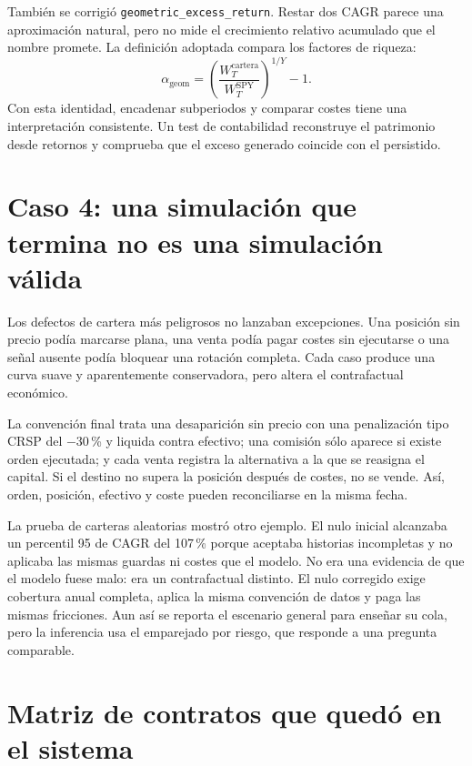 También se corrigió \texttt{geometric\_excess\_return}. Restar dos CAGR parece una aproximación
natural, pero no mide el crecimiento relativo acumulado que el nombre promete. La definición
adoptada compara los factores de riqueza:
\[
 \alpha_{\mathrm{geom}}=
 \left(\frac{W_T^{\mathrm{cartera}}}{W_T^{\mathrm{SPY}}}\right)^{1/Y}-1.
\]
Con esta identidad, encadenar subperiodos y comparar costes tiene una interpretación consistente.
Un test de contabilidad reconstruye el patrimonio desde retornos y comprueba que el exceso generado
coincide con el persistido.

\section{Caso 4: una simulación que termina no es una simulación válida}

Los defectos de cartera más peligrosos no lanzaban excepciones. Una posición sin precio podía
marcarse plana, una venta podía pagar costes sin ejecutarse o una señal ausente podía bloquear una
rotación completa. Cada caso produce una curva suave y aparentemente conservadora, pero altera el
contrafactual económico.

La convención final trata una desaparición sin precio con una penalización tipo CRSP del
$-30$\,\% y liquida contra efectivo; una comisión sólo aparece si existe orden ejecutada; y cada
venta registra la alternativa a la que se reasigna el capital. Si el destino no supera la posición
después de costes, no se vende. Así, orden, posición, efectivo y coste pueden reconciliarse en la
misma fecha.

La prueba de carteras aleatorias mostró otro ejemplo. El nulo inicial alcanzaba un percentil 95 de
CAGR del 107\,\% porque aceptaba historias incompletas y no aplicaba las mismas guardas ni costes que
el modelo. No era una evidencia de que el modelo fuese malo: era un contrafactual distinto. El nulo
corregido exige cobertura anual completa, aplica la misma convención de datos y paga las mismas
fricciones. Aun así se reporta el escenario general para enseñar su cola, pero la inferencia usa el
emparejado por riesgo, que responde a una pregunta comparable.

\section{Matriz de contratos que quedó en el sistema}

